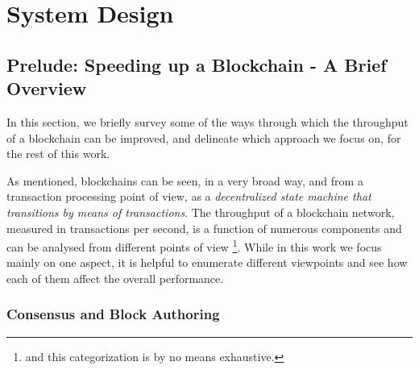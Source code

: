 \chapter{System Design} \label{chap:design}




\section{Prelude: Speeding up a Blockchain - A Brief Overview}
\label{chap_design:sec:ways_to_speedup}

In this section, we briefly survey some of the ways through which the throughput of a blockchain can
be improved, and delineate which approach we focus on, for the rest of this work.

As mentioned, blockchains can be seen, in a very broad way, and from a transaction processing point
of view, as a \textit{decentralized state machine that transitions by means of transactions}. The
throughput of a blockchain network, measured in transactions per second, is a function of numerous
components and can be analysed from different points of view \footnote{and this categorization is by
no means exhaustive.}. While in this work we focus mainly on one aspect, it is helpful to enumerate
different viewpoints and see how each of them affect the overall performance.

\subsection{Consensus and Block Authoring}

